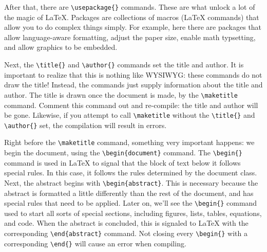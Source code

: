 \documentclass{article}
\begin{document}
After that, there are \verb|\usepackage{}| commands. These are what unlock a lot of the magic of \LaTeX{}. Packages are collections of macros (\LaTeX{} commands) that allow you to do complex things simply. For example, here there are packages that allow language-aware formatting, adjust the paper size, enable math typsetting, and allow graphics to be embedded.

Next, the \verb|\title{}| and \verb|\author{}| commands set the title and author. It is important to realize that this is nothing like WYSIWYG: these commands do not draw the title! Instead, the commands just supply information about the title and author. The title is drawn once the document is made, by the \verb|\maketitle| command. Comment this command out and re-compile: the title and author will be gone. Likewise, if you attempt to call \verb|\maketitle| without the \verb|\title{}| and \verb|\author{}| set, the compilation will result in errors.

Right before the \verb|\maketitle| command, something very important happens: we begin the document, using the \verb|\begin{document}| command. The \verb|\begin{}| command is used in \LaTeX{} to signal that the block of text below it follows special rules. In this case, it follows the rules determined by the document class. Next, the abstract begins with \verb|\begin{abstract}|. This is necessary because the abstract is formatted a little differently than the rest of the document, and has special rules that need to be applied. Later on, we'll see the \verb|\begin{}| command used to start all sorts of special sections, including figures, lists, tables, equations, and code.
When the abstract is concluded, this is signaled to \LaTeX{} with the corresponding \verb|\end{abstract}| command. Not closing every \verb|\begin{}| with a corresponding \verb|\end{}| will cause an error when compiling.
\end{document}
